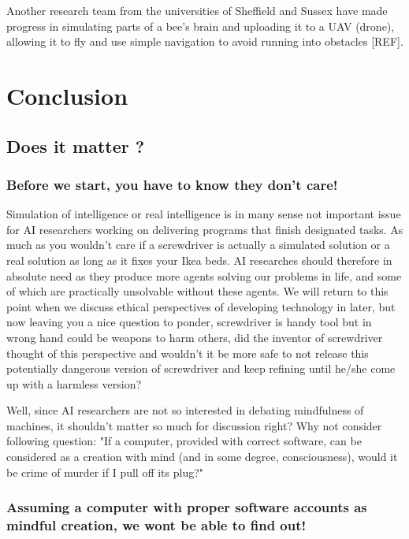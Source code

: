\documentclass[11pt]{article}
\begin{document}
Another research team from the universities of Sheffield and Sussex have made progress in simulating parts of a bee's brain and uploading it to a UAV (drone), allowing it to fly and use simple navigation to avoid running into obstacles [REF].


\section{Conclusion}
\label{sec:conclusion}

\subsection{Does it matter ?}

\subsubsection{Before we start, you have to know they don’t care!}

Simulation of intelligence or real intelligence is in many sense not important issue for AI researchers working on delivering programs that finish designated tasks. As much as you wouldn't care if a screwdriver is actually a simulated solution or a real solution as long as it fixes your Ikea beds. AI researches should therefore in absolute need as they produce more agents solving our problems in life, and some of which are practically unsolvable without these agents. We will return to this point when we discuss ethical perspectives of developing technology in later, but now leaving you a nice question to ponder, screwdriver is handy tool but in wrong hand could be weapons to harm others, did the inventor of screwdriver thought of this perspective and wouldn’t it be more safe to not release this potentially dangerous version of screwdriver and keep refining until he/she come up with a harmless version?
  
Well, since AI researchers are not so interested in debating mindfulness of machines, it shouldn't matter so much for discussion right? Why not consider following question: "If a computer, provided with correct software, can be considered as a creation with mind (and in some degree, consciousness), would it be crime of murder if I pull off its plug?"

\subsubsection{Assuming a computer with proper software accounts as mindful creation, we wont be able to find out!}
\end{document}
